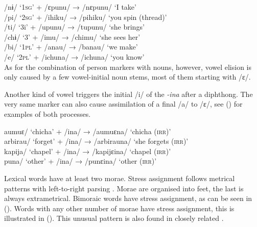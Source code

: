 \renewcommand{\exfont}{\normalsize\upshape}
\TabPositions{1cm,2cm,3cm,4cm,5cm,6cm,7cm,8cm,9cm}
\ea\label{ex:Sketch-VE-1}
      /nɨ/ ‘1\textsc{sg}’ \tab + \tab /ɛpunu/ \tab → \tab /nɛpunu/  \tab ‘I take’ \\
       /pi/ ‘2\textsc{sg}’ \tab + \tab /ihiku/ \tab → \tab /pihiku/ \tab ‘you spin (thread)’ \\
       /ti/ ‘3i’ \tab + \tab /upunu/ \tab → \tab /tupunu/ \tab ‘she brings’ \\
       /chɨ/ ‘3’ \tab + \tab /imu/ \tab\tab → \tab /chimu/ \tab ‘she sees her’ \\
       /bi/ ‘1\textsc{pl}’ \tab + \tab /anau/ \tab → \tab /banau/ \tab ‘we make’ \\ %
       /e/ ‘2\textsc{pl}’  \tab + \tab /ichuna/ \tab → \tab /ichuna/ \tab ‘you know’\\
\xe
As for the combination of person markers with nouns, however, vowel elision is only caused by a few vowel-initial noun stems, most of them starting with /ɛ/.

Another kind of vowel  triggers the initial /i/ of the  \textit{-ina} after a diphthong. The very same marker can also cause assimilation of a final /a/ to /ɛ/, see () for examples of both processes.


\ea\label{ex:Sketch-Phon-ina}
\ea\label{ex:Sketch-Phon-ina.1}	\tab{/}aumuɛ/ ‘chicha’ + /ina/ \tab → \tab /aumuɛna/ \tab ‘chicha (\textsc{irr})’\\
 \tab {/}arbirau/ ‘forget’ + /ina/ \tab → \tab  /arbirauna/ \tab ‘she forgets (\textsc{irr})’\\
 \ex\label{ex:Sketch-Phon-ina.2}\tab{/}kapija/ ‘chapel’ + /ina/ \tab → \tab /kapijɛina/ \tab ‘chapel (\textsc{irr})’\\
	\tab{/}puna/ ‘other’ + /ina/ \tab → \tab /punɛina/ \tab ‘other (\textsc{irr})’\\
\z
\xe

 
Lexical words have at least two morae. Stress assignment follows metrical patterns with left-to-right parsing \citep[cf.][]{Hayes1995}. Morae are organised into feet, the last  is always extrametrical. Bimoraic words have  stress assignment, as can be seen in (). Words with any other number of morae have  stress assignment, this is illustrated in (). This unusual pattern is also found in closely related  \citep[]{Rose2019}. 



